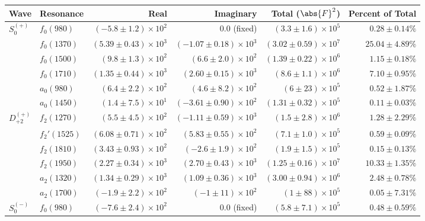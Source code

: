 \begin{table}[ht]
    \begin{center}
        \begin{tabular}{llrrrr}\toprule
        Wave & Resonance & Real & Imaginary & Total ($\abs{F}^2$) & Percent of Total \\\midrule
$S_{0}^{(+)}$ & $f_{0}(980)$ & $(-5.8 \pm 1.2) \times 10^{2}$ & $0.0$ (fixed) & $(3.3 \pm 1.6) \times 10^{5}$ & $0.28 \pm 0.14 \%$ \\
 & $f_{0}(1370)$ & $(5.39 \pm 0.43) \times 10^{3}$ & $(-1.07 \pm 0.18) \times 10^{3}$ & $(3.02 \pm 0.59) \times 10^{7}$ & $25.04 \pm 4.89 \%$ \\
 & $f_{0}(1500)$ & $(9.8 \pm 1.3) \times 10^{2}$ & $(6.6 \pm 2.0) \times 10^{2}$ & $(1.39 \pm 0.22) \times 10^{6}$ & $1.15 \pm 0.18 \%$ \\
 & $f_{0}(1710)$ & $(1.35 \pm 0.44) \times 10^{3}$ & $(2.60 \pm 0.15) \times 10^{3}$ & $(8.6 \pm 1.1) \times 10^{6}$ & $7.10 \pm 0.95 \%$ \\
 & $a_{0}(980)$ & $(6.4 \pm 2.2) \times 10^{2}$ & $(4.6 \pm 8.2) \times 10^{2}$ & $(6 \pm 23) \times 10^{5}$ & $0.52 \pm 1.87 \%$ \\
 & $a_{0}(1450)$ & $(1.4 \pm 7.5) \times 10^{1}$ & $(-3.61 \pm 0.90) \times 10^{2}$ & $(1.31 \pm 0.32) \times 10^{5}$ & $0.11 \pm 0.03 \%$ \\
$D_{+2}^{(+)}$ & $f_{2}(1270)$ & $(5.5 \pm 4.5) \times 10^{2}$ & $(-1.11 \pm 0.59) \times 10^{3}$ & $(1.5 \pm 2.8) \times 10^{6}$ & $1.28 \pm 2.29 \%$ \\
 & $f_{2}'(1525)$ & $(6.08 \pm 0.71) \times 10^{2}$ & $(5.83 \pm 0.55) \times 10^{2}$ & $(7.1 \pm 1.0) \times 10^{5}$ & $0.59 \pm 0.09 \%$ \\
 & $f_{2}(1810)$ & $(3.43 \pm 0.93) \times 10^{2}$ & $(-2.6 \pm 1.9) \times 10^{2}$ & $(1.9 \pm 1.5) \times 10^{5}$ & $0.15 \pm 0.13 \%$ \\
 & $f_{2}(1950)$ & $(2.27 \pm 0.34) \times 10^{3}$ & $(2.70 \pm 0.43) \times 10^{3}$ & $(1.25 \pm 0.16) \times 10^{7}$ & $10.33 \pm 1.35 \%$ \\
 & $a_{2}(1320)$ & $(1.34 \pm 0.29) \times 10^{3}$ & $(1.09 \pm 0.36) \times 10^{3}$ & $(3.00 \pm 0.94) \times 10^{6}$ & $2.48 \pm 0.78 \%$ \\
 & $a_{2}(1700)$ & $(-1.9 \pm 2.2) \times 10^{2}$ & $(-1 \pm 11) \times 10^{2}$ & $(1 \pm 88) \times 10^{5}$ & $0.05 \pm 7.31 \%$ \\
$S_{0}^{(-)}$ & $f_{0}(980)$ & $(-7.6 \pm 2.4) \times 10^{2}$ & $0.0$ (fixed) & $(5.8 \pm 7.1) \times 10^{5}$ & $0.48 \pm 0.59 \%$ \\

\end{tabular}
\end{center}
\end{table}
